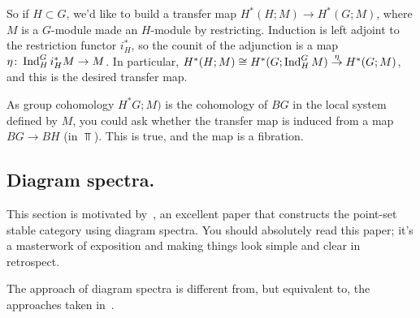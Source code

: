 So if $H\subset G$, we'd like to build a transfer map $H^*(H;M)\to H^*(G;M)$, where $M$ is a $G$-module made an
$H$-module by restricting. Induction is left adjoint to the restriction functor $i_H^*$, so the counit of the
adjunction is a map $\eta\colon\operatorname{Ind}_H^G i_H^*M\to M$. In particular, $H^*(H;M)\cong H^*(G;\operatorname{Ind}_H^G
M)\stackrel\eta\to H^*(G;M)$, and this is the desired transfer map.

As group cohomology $H^*G;M)$ is the cohomology of $BG$ in the local system defined by $M$, you could ask whether
the transfer map is induced from a map $BG\to BH$ (in $\Top$). This is true, and the map is a fibration.
\subsection*{Diagram spectra.}
This section is motivated by~\cite{MMSS}, an excellent paper that constructs the point-set stable category using
diagram spectra. You should absolutely read this paper; it's a masterwork of exposition and making things look
simple and clear in retrospect.

The approach of diagram spectra is different from, but equivalent to, the approaches taken
in~\cite{LMS,AlaskaNotes}.

